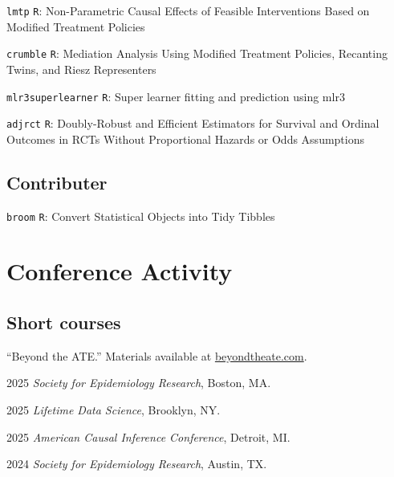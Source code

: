 \documentclass[12pt,letterpaper]{report}
\newcommand{\listitemspace}{0.15em}
\renewenvironment{itemize}
{\begin{list}{}{\setlength{\leftmargin}{0em}
            \setlength{\parskip}{0em}
            \setlength{\itemsep}{\listitemspace}
            \setlength{\parsep}{\listitemspace}}}
    {\end{list}}
\begin{document}
    \begin{tablist}
    
    	\item[{\footnotesize \texttt{lmtp}}] \tab \texttt{R}: Non-Parametric Causal Effects of Feasible Interventions Based on Modified Treatment Policies
	
	    	\item[{\footnotesize \texttt{crumble}}] \tab \texttt{R}: Mediation Analysis Using Modified Treatment Policies, Recanting Twins, and Riesz Representers
		
		\item[{\footnotesize \texttt{mlr3superlearner}}] \tab \texttt{R}: Super learner fitting and prediction using mlr3
		
		\item[{\footnotesize \texttt{adjrct}}] \tab \texttt{R}: Doubly-Robust and Efficient Estimators for Survival and Ordinal Outcomes in RCTs Without Proportional Hazards or Odds Assumptions
    
    \end{tablist}
    
    \subsection*{Contributer}
    
    \begin{tablist}
    
    	\item[{\footnotesize \texttt{broom}}] \tab \texttt{R}: Convert Statistical Objects into Tidy Tibbles
    
    \end{tablist}

    \section*{Conference Activity}
    
    \subsection*{Short courses}
    
     \enquote{Beyond the ATE.} Materials available at \href{https://beyondtheate.com/}{beyondtheate.com}.\\
    
    \begin{itemize}
    
    \item \hspace{1em} 2025 \textit{Society for Epidemiology Research}, Boston, MA. 
    \item \hspace{1em} 2025 \textit{Lifetime Data Science}, Brooklyn, NY. 
    \item \hspace{1em} 2025 \textit{American Causal Inference Conference}, Detroit, MI. 
    \item \hspace{1em} 2024 \textit{Society for Epidemiology Research}, Austin, TX. 
    
    \end{itemize}
    
\end{document}
